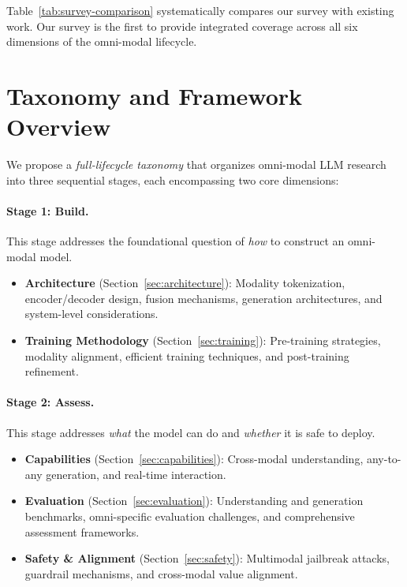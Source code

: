 \documentclass{article}
\begin{document}
Table~\ref{tab:survey-comparison} systematically compares our survey with existing work.
Our survey is the first to provide integrated coverage across all six dimensions of the omni-modal lifecycle.

\section{Taxonomy and Framework Overview}
\label{sec:taxonomy}


We propose a \emph{full-lifecycle taxonomy} that organizes omni-modal LLM research into three sequential stages, each encompassing two core dimensions:

\paragraph{Stage 1: Build.}
This stage addresses the foundational question of \emph{how} to construct an omni-modal model.
\begin{itemize}
    \item \textbf{Architecture} (Section~\ref{sec:architecture}): Modality tokenization, encoder/decoder design, fusion mechanisms, generation architectures, and system-level considerations.
    \item \textbf{Training Methodology} (Section~\ref{sec:training}): Pre-training strategies, modality alignment, efficient training techniques, and post-training refinement.
\end{itemize}

\paragraph{Stage 2: Assess.}
This stage addresses \emph{what} the model can do and \emph{whether} it is safe to deploy.
\begin{itemize}
    \item \textbf{Capabilities} (Section~\ref{sec:capabilities}): Cross-modal understanding, any-to-any generation, and real-time interaction.
    \item \textbf{Evaluation} (Section~\ref{sec:evaluation}): Understanding and generation benchmarks, omni-specific evaluation challenges, and comprehensive assessment frameworks.
    \item \textbf{Safety \& Alignment} (Section~\ref{sec:safety}): Multimodal jailbreak attacks, guardrail mechanisms, and cross-modal value alignment.
\end{itemize}
\end{document}
